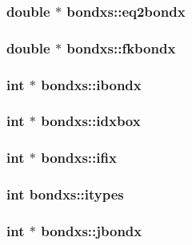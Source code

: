 \subsubsection{\setlength{\rightskip}{0pt plus 5cm}double $\ast$ {\bf bondxs::eq2bondx}}\label{structbondxs_4dee029fde5f529520f03dc4bf4ec093}


\subsubsection{\setlength{\rightskip}{0pt plus 5cm}double $\ast$ {\bf bondxs::fkbondx}}\label{structbondxs_cd489ec11c0acc9a5177251c2a7dd7f1}


\subsubsection{\setlength{\rightskip}{0pt plus 5cm}int $\ast$ {\bf bondxs::ibondx}}\label{structbondxs_872150401486aee55825209ee8f1c13b}


\subsubsection{\setlength{\rightskip}{0pt plus 5cm}int $\ast$ {\bf bondxs::idxbox}}\label{structbondxs_97a8ca0fdf9f79447a3db8ec88f84bcd}


\subsubsection{\setlength{\rightskip}{0pt plus 5cm}int $\ast$ {\bf bondxs::ifix}}\label{structbondxs_230889638ef3693a2a63434a55b9f52e}


\subsubsection{\setlength{\rightskip}{0pt plus 5cm}int {\bf bondxs::itypes}}\label{structbondxs_6ad6728435adeeb6be787e168f2c5e58}


\subsubsection{\setlength{\rightskip}{0pt plus 5cm}int $\ast$ {\bf bondxs::jbondx}}\label{structbondxs_ab54caed3ec3a25f6f6d0f1a198f8423}


